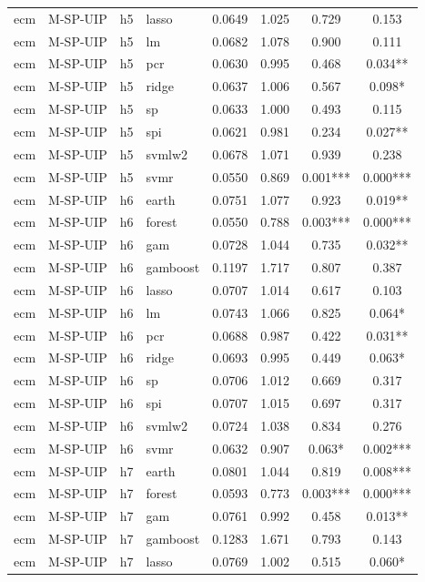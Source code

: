 \begin{ThreePartTable}
\begin{longtable}[t]{llclcccc}
ecm & M-SP-UIP & h5 & lasso & 0.0649 & 1.025 & 0.729 & 0.153\\
ecm & M-SP-UIP & h5 & lm & 0.0682 & 1.078 & 0.900 & 0.111\\
ecm & M-SP-UIP & h5 & pcr & 0.0630 & 0.995 & 0.468 & 0.034**\\
ecm & M-SP-UIP & h5 & ridge & 0.0637 & 1.006 & 0.567 & 0.098*\\
ecm & M-SP-UIP & h5 & sp & 0.0633 & 1.000 & 0.493 & 0.115\\
ecm & M-SP-UIP & h5 & spi & 0.0621 & 0.981 & 0.234 & 0.027**\\
ecm & M-SP-UIP & h5 & svmlw2 & 0.0678 & 1.071 & 0.939 & 0.238\\
ecm & M-SP-UIP & h5 & svmr & 0.0550 & 0.869 & 0.001*** & 0.000***\\
\addlinespace
ecm & M-SP-UIP & h6 & earth & 0.0751 & 1.077 & 0.923 & 0.019**\\
ecm & M-SP-UIP & h6 & forest & 0.0550 & 0.788 & 0.003*** & 0.000***\\
ecm & M-SP-UIP & h6 & gam & 0.0728 & 1.044 & 0.735 & 0.032**\\
ecm & M-SP-UIP & h6 & gamboost & 0.1197 & 1.717 & 0.807 & 0.387\\
ecm & M-SP-UIP & h6 & lasso & 0.0707 & 1.014 & 0.617 & 0.103\\
ecm & M-SP-UIP & h6 & lm & 0.0743 & 1.066 & 0.825 & 0.064*\\
ecm & M-SP-UIP & h6 & pcr & 0.0688 & 0.987 & 0.422 & 0.031**\\
ecm & M-SP-UIP & h6 & ridge & 0.0693 & 0.995 & 0.449 & 0.063*\\
ecm & M-SP-UIP & h6 & sp & 0.0706 & 1.012 & 0.669 & 0.317\\
ecm & M-SP-UIP & h6 & spi & 0.0707 & 1.015 & 0.697 & 0.317\\
ecm & M-SP-UIP & h6 & svmlw2 & 0.0724 & 1.038 & 0.834 & 0.276\\
ecm & M-SP-UIP & h6 & svmr & 0.0632 & 0.907 & 0.063* & 0.002***\\
\addlinespace
ecm & M-SP-UIP & h7 & earth & 0.0801 & 1.044 & 0.819 & 0.008***\\
ecm & M-SP-UIP & h7 & forest & 0.0593 & 0.773 & 0.003*** & 0.000***\\
ecm & M-SP-UIP & h7 & gam & 0.0761 & 0.992 & 0.458 & 0.013**\\
ecm & M-SP-UIP & h7 & gamboost & 0.1283 & 1.671 & 0.793 & 0.143\\
ecm & M-SP-UIP & h7 & lasso & 0.0769 & 1.002 & 0.515 & 0.060*\\

\end{longtable}
\end{ThreePartTable}
